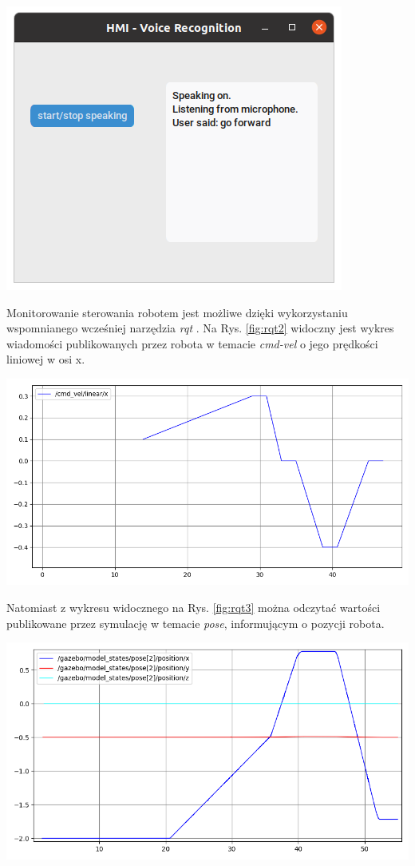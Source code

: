 \begin{center}
    \includegraphics[width=0.8\linewidth]{files/panel_2.png}
    \label{fig:panel_2}
\end{center}

\break
Monitorowanie sterowania robotem jest możliwe dzięki wykorzystaniu wspomnianego wcześniej narzędzia \textit{rqt} \cite{rqt}. Na Rys. \ref{fig:rqt2} widoczny jest wykres wiadomości publikowanych przez robota w temacie \textit{cmd-vel} o jego prędkości liniowej w osi x.

\begin{center}
    \includegraphics[width=0.9\linewidth]{files/rqt2.png}
    \label{fig:rqt2}
\end{center}

Natomiast z wykresu widocznego na Rys. \ref{fig:rqt3} można odczytać wartości publikowane przez symulację w temacie \textit{pose}, informującym o pozycji robota.

\begin{center}
    \includegraphics[width=0.9\linewidth]{files/rqt3.png}
    \label{fig:rqt3}
\end{center}